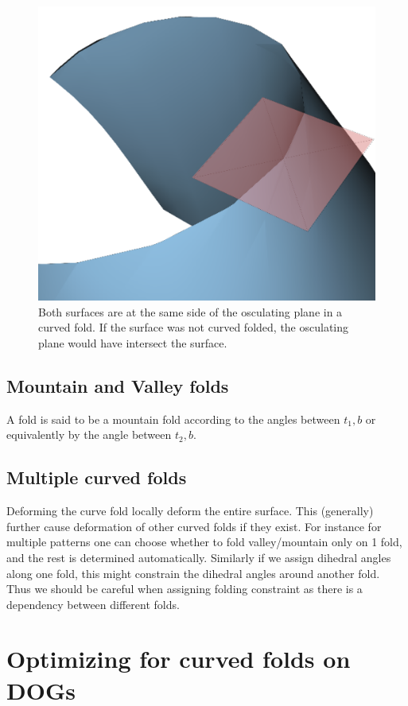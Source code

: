 \documentclass{article}
\theoremstyle{definition}
\begin{document}
\begin{figure} [h]
	\centering
	\includegraphics[width=0.5\linewidth]{plane_side}
	\caption{Both surfaces are at the same side of the osculating plane in a curved fold. If the surface was not curved folded, the osculating plane would have intersect the surface.}
	\label{fig:curved_fold_through_curve}
\end{figure}

\subsection{Mountain and Valley folds}
A fold is said to be a mountain fold according to the angles between $t_1,b$ or equivalently by the angle between $t_2,b$.

\subsection{Multiple curved folds}
Deforming the curve fold locally deform the entire surface. This (generally) further cause deformation of other curved folds if they exist. For instance for multiple patterns one can choose whether to fold valley/mountain only on 1 fold, and the rest is determined automatically. Similarly if we assign dihedral angles along one fold, this might constrain the dihedral angles around another fold. Thus we should be careful when assigning folding constraint as there is a dependency between different folds.
	

\section{Optimizing for curved folds on DOGs}
\end{document}
